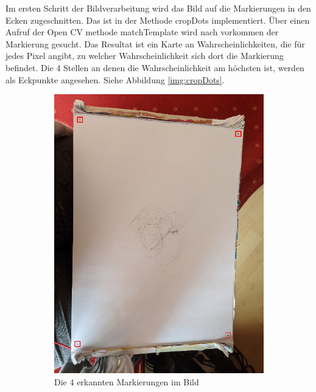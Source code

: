 \documentclass[german,a4paper, 12pt]{llncs}
\begin{document}
Im ersten Schritt der Bildverarbeitung wird das Bild auf die Markierungen in den Ecken zugeschnitten. Das ist in der Methode cropDots implementiert.
Über einen Aufruf der Open CV methode matchTemplate wird nach vorkommen der Markierung gesucht. Das Resultat ist ein Karte an Wahrscheinlichkeiten, die für jedes Pixel angibt, zu welcher Wahrscheinlichkeit sich dort die Markierung befindet. Die 4 Stellen an denen die Wahrscheinlichkeit am höchsten ist, werden als Eckpunkte angesehen. Siehe Abbildung \ref{img:cropDots}.\cite{TemplateMatchingCV} 
\begin{figure}
	\centering
	\begin{subfigure}[b]{0.475\textwidth}   
		\centering
		\includegraphics[width=\textwidth]{fig64/03rectImg.png}
		\caption[]{Die 4 erkannten Markierungen im Bild}
		\label{img:foundDots}
	\end{subfigure}
	\quad
	\begin{subfigure}[b]{0.475\textwidth}   
		\centering

\end{subfigure}
\end{figure}
\end{document}

